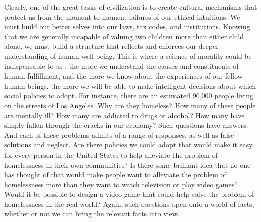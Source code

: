 \documentclass[a4paper,14pt]{extbook}
\begin{document}
Clearly, one of the great tasks of civilization is to create cultural mechanisms that protect us from the moment-to-moment failures of our ethical intuitions.
We must build our better selves into our laws, tax codes, and institutions.
Knowing that we are generally incapable of valuing two children more than either child alone, we must build a structure that reflects and enforces our deeper understanding of human well-being.
This is where a science of morality could be indispensable to us :
the more we understand the causes and constituents of human fulfillment, and the more we know about the experiences of our fellow human beings, the more we will be able to make intelligent decisions about which social policies to adopt.
For instance, there are an estimated 90,000 people living on the streets of Los Angeles.
Why are they homeless?
How many of these people are mentally ill?
How many are addicted to drugs or alcohol?
How many have simply fallen through the cracks in our economy?
Such questions have answers.
And each of these problems admits of a range of responses, as well as false solutions and neglect.
Are there policies we could adopt that would make it easy for every person in the United States to help alleviate the problem of homelessness in their own communities?
Is there some brilliant idea that no one has thought of that would make people want to alleviate the problem of homelessness more than they want to watch television or play video games?
Would it be possible to design a video game that could help solve the problem of homelessness in the real world?
Again, such questions open onto a world of facts, whether or not we can bring the relevant facts into view.
\end{document}
